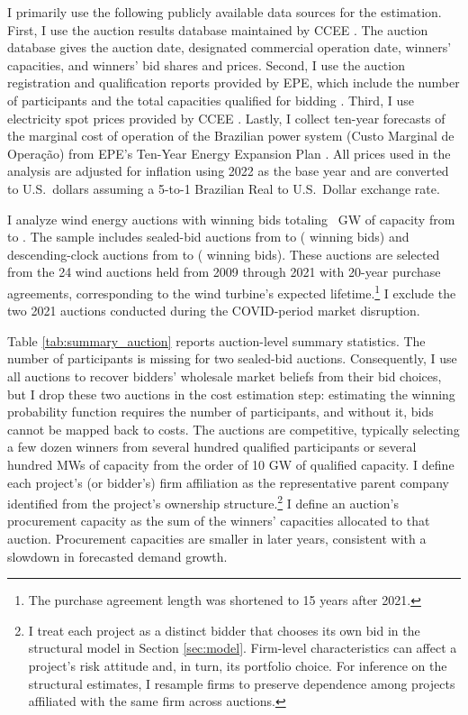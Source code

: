 \documentclass[12pt]{article}
\theoremstyle{definition} %
\begin{document}
I primarily use the following publicly available data sources for the estimation. First, I use the auction results database maintained by CCEE \citep{CCEE2022}. The auction database gives the auction date, designated commercial operation date, winners' capacities, and winners' bid shares and prices. Second, I use the auction registration and qualification reports provided by EPE, which include the number of participants and the total capacities qualified for bidding \citep{EPE2022a}. Third, I use electricity spot prices provided by CCEE \citep{CCEE2023}. Lastly, I collect ten-year forecasts of the marginal cost of operation of the Brazilian power system (Custo Marginal de Operação) from EPE's Ten-Year Energy Expansion Plan \citep{EPE2026}. All prices used in the analysis are adjusted for inflation using 2022 as the base year and are converted to U.S.\ dollars assuming a 5-to-1 Brazilian Real to U.S.\ Dollar exchange rate.

I analyze  wind energy auctions with  winning bids totaling ~GW of capacity from  to . The sample includes  sealed-bid auctions from  to  ( winning bids) and  descending-clock auctions from  to  ( winning bids). These auctions are selected from the 24 wind auctions held from 2009 through 2021 with 20-year purchase agreements, corresponding to the wind turbine's expected lifetime.\footnote{The purchase agreement length was shortened to 15 years after 2021.} I exclude the two 2021 auctions conducted during the COVID-period market disruption.

Table \ref{tab:summary_auction} reports auction-level summary statistics. The number of participants is missing for two sealed-bid auctions. Consequently, I use all  auctions to recover bidders' wholesale market beliefs from their bid choices, but I drop these two auctions in the cost estimation step: estimating the winning probability function requires the number of participants, and without it, bids cannot be mapped back to costs. The auctions are competitive, typically selecting a few dozen winners from several hundred qualified participants or several hundred MWs of capacity from the order of 10 GW of qualified capacity. I define each project's (or bidder's) firm affiliation as the representative parent company identified from the project's ownership structure.\footnote{
I treat each project as a distinct bidder that chooses its own bid in the structural model in Section \ref{sec:model}. Firm-level characteristics can affect a project's risk attitude and, in turn, its portfolio choice. For inference on the structural estimates, I resample firms to preserve dependence among projects affiliated with the same firm across auctions.
} I define an auction's procurement capacity as the sum of the winners' capacities allocated to that auction. Procurement capacities are smaller in later years, consistent with a slowdown in forecasted demand growth.
\end{document}
